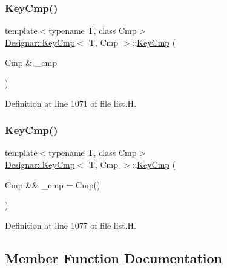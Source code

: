 \subsubsection{\texorpdfstring{Key\+Cmp()}{KeyCmp()}\hspace{0.1cm}{\footnotesize\ttfamily [1/2]}}
{\footnotesize\ttfamily template$<$typename T, class Cmp$>$ \\
\hyperlink{struct_designar_1_1_key_cmp}{Designar\+::\+Key\+Cmp}$<$ T, Cmp $>$\+::\hyperlink{struct_designar_1_1_key_cmp}{Key\+Cmp} (\begin{DoxyParamCaption}\item[{Cmp \&}]{\+\_\+cmp }\end{DoxyParamCaption})\hspace{0.3cm}{\ttfamily [inline]}}



Definition at line 1071 of file list.\+H.

\mbox{\label{struct_designar_1_1_key_cmp_a9e5e19bf38ff54d6c3dad828ceb63cd2}} 
\subsubsection{\texorpdfstring{Key\+Cmp()}{KeyCmp()}\hspace{0.1cm}{\footnotesize\ttfamily [2/2]}}
{\footnotesize\ttfamily template$<$typename T, class Cmp$>$ \\
\hyperlink{struct_designar_1_1_key_cmp}{Designar\+::\+Key\+Cmp}$<$ T, Cmp $>$\+::\hyperlink{struct_designar_1_1_key_cmp}{Key\+Cmp} (\begin{DoxyParamCaption}\item[{Cmp \&\&}]{\+\_\+cmp = {\ttfamily Cmp()} }\end{DoxyParamCaption})\hspace{0.3cm}{\ttfamily [inline]}}



Definition at line 1077 of file list.\+H.



\subsection{Member Function Documentation}
\mbox{\label{struct_designar_1_1_key_cmp_aa48c4fb700b4ba3bd243c3426288455e}} 
